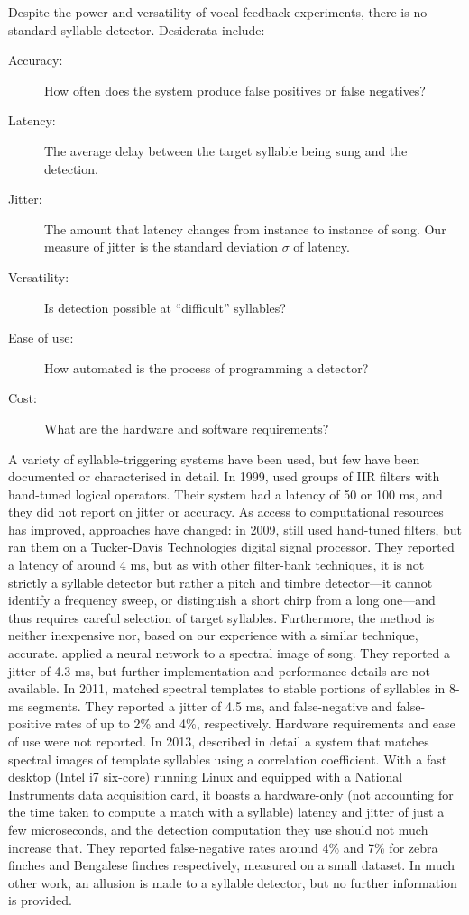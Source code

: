 \documentclass[10pt,letterpaper]{article}
\begin{document}
Despite the power and versatility of vocal feedback experiments, there
is no standard syllable detector.  Desiderata include:
\begin{description}
\item[Accuracy:] How often does the system produce false positives or false negatives?
\item[Latency:] The average delay between the target syllable being sung and the detection.
\item[Jitter:] The amount that latency changes from instance to instance of song.  Our measure of jitter is the standard deviation $\sigma$ of latency.
\item[Versatility:] Is detection possible at ``difficult'' syllables?
\item[Ease of use:] How automated is the process of programming a detector?
\item[Cost:] What are the hardware and software requirements?
\end{description}

A variety of syllable-triggering systems have been used, but few have
been documented or characterised in detail.  In 1999,
\cite{Leonardo1999} used groups of IIR filters with hand-tuned logical
operators.  Their system had a latency of 50 or 100 ms,
and they did not report on jitter or accuracy.  As access to
computational resources has improved, approaches have changed: in
2009, \cite{Andalman2009} still used hand-tuned filters, but ran them
on a Tucker-Davis Technologies digital signal processor.  They reported
a latency of around 4 ms, but as with other filter-bank techniques, it
is not strictly a syllable detector but rather a pitch and timbre
detector---it cannot identify a frequency sweep, or distinguish a
short chirp from a long one---and thus requires careful selection of
target syllables.  Furthermore, the method is neither inexpensive nor,
based on our experience with a similar technique, accurate.
\cite{Keller2009} applied a neural network to a spectral image of
song.  They reported a jitter of 4.3 ms, but further implementation and
performance details are not available.  In 2011, \cite{Warren2011}
matched spectral templates to stable portions of syllables in 8-ms
segments.  They reported a jitter of 4.5 ms, and false-negative and
false-positive rates of up to 2\% and 4\%, respectively.  Hardware
requirements and ease of use were not reported.  In 2013,
\cite{Skocik2013} described in detail a system that matches spectral
images of template syllables using a correlation coefficient.  With a
fast desktop (Intel i7 six-core) running Linux and equipped with a
National Instruments data acquisition card, it boasts a hardware-only
(not accounting for the time taken to compute a match with a syllable)
latency and jitter of just a few microseconds, and the detection
computation they use should not much increase that.  They reported
false-negative rates around 4\% and 7\% for zebra finches and
Bengalese finches respectively, measured on a small dataset.  In much
other work, an allusion is made to a syllable detector, but no further
information is provided.
\end{document}
